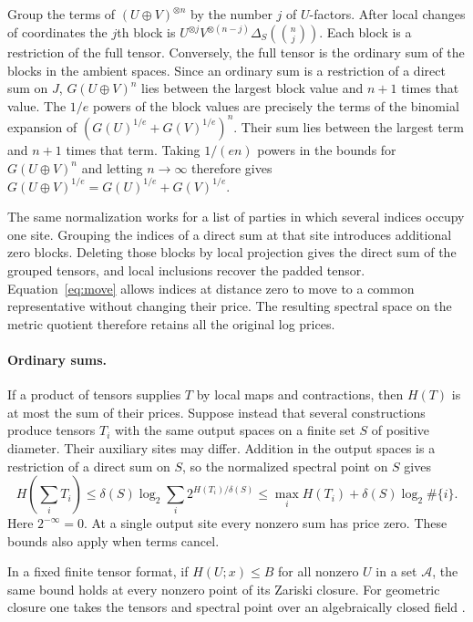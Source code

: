Group the terms of $(U\oplus V)^{\otimes n}$ by the number $j$ of
$U$-factors. After local changes of coordinates the $j$th block is
$U^{\otimes j}V^{\otimes(n-j)}\Delta_S(\binom nj)$. Each block is a
restriction of the full tensor. Conversely, the full tensor is the
ordinary sum of the blocks in the ambient spaces. Since an ordinary sum
is a restriction of a direct sum on $J$, $G(U\oplus V)^n$ lies between
the largest block value and $n+1$ times that value. The $1/e$ powers
of the block values are precisely the terms of the binomial expansion
of $(G(U)^{1/e}+G(V)^{1/e})^n$. Their sum lies between the largest
term and $n+1$ times that term. Taking $1/(en)$ powers in the bounds
for $G(U\oplus V)^n$ and letting $n\to\infty$ therefore gives
$G(U\oplus V)^{1/e}=G(U)^{1/e}+G(V)^{1/e}$.

The same normalization works for a list of parties in which several
indices occupy one site. Grouping the indices of a direct sum at that
site introduces additional zero blocks. Deleting those blocks by local
projection gives the direct sum of the grouped tensors, and local
inclusions recover the padded tensor. Equation~\eqref{eq:move} allows
indices at distance zero to move to a common representative without
changing their price. The resulting spectral space on the metric
quotient therefore retains all the original log prices.

\paragraph{Ordinary sums.}
If a product of tensors supplies $T$ by local maps and contractions,
then $H(T)$ is at most the sum of their prices. Suppose instead that
several constructions produce tensors $T_i$ with the same output
spaces on a finite set $S$ of positive diameter. Their auxiliary sites
may differ. Addition in the output spaces is a restriction of a direct
sum on $S$, so the normalized spectral point on $S$ gives
\begin{equation}\label{eq:price-ordinary-sum}
 H\!\left(\sum_i T_i\right)
 \le \delta(S)\log_2\sum_i 2^{H(T_i)/\delta(S)}
 \le \max_i H(T_i)+\delta(S)\log_2\#\{i\}.
\end{equation}
Here $2^{-\infty}=0$. At a single output site every nonzero sum has price
zero. These bounds also apply when terms cancel.

\begin{lemma}\label{lem:spectral-closure}\label{lem:border-test}
In a fixed finite tensor format, if $H(U;x)\le B$ for all nonzero $U$
in a set $\mathcal A$, the same bound holds at every nonzero point of its
Zariski closure.
For geometric closure one takes the tensors and spectral point over an
algebraically closed field \cite[Corollary~2.4]{SpectralSublevels}.
\end{lemma}

